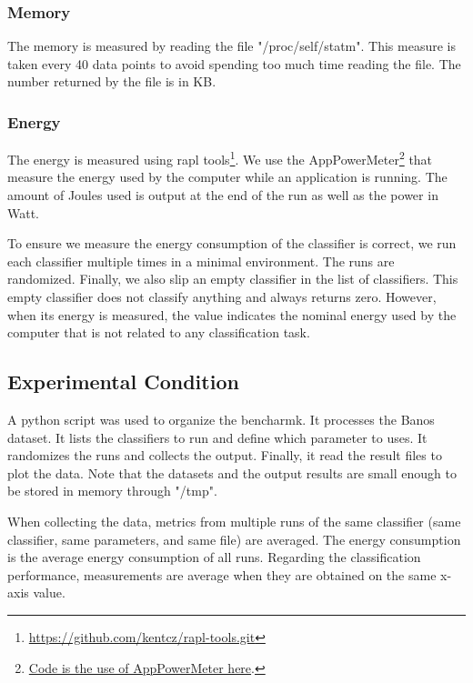\subsubsection{Memory}
The memory is measured by reading the file "/proc/self/statm". This measure is
taken every 40 data points to avoid spending too much time reading the file.
The number returned by the file is in KB.

\subsubsection{Energy}
The energy is measured using rapl
tools\footnote{\url{https://github.com/kentcz/rapl-tools.git}}.
We use the
AppPowerMeter\footnote{\href{https://github.com/azazel7/paper-benchmark/blob/9adb1039c5a65a00a66d554f0e870d14d3fff7cb/makefile.py\#L122}{Code
is the use of AppPowerMeter here}.} that measure
the energy used by the computer while an
application is running. The amount of Joules used
is output at the end of the run as well as the
power in Watt.

To ensure we measure the energy consumption of the
classifier is correct, we run each classifier
multiple times in a minimal environment. The runs
are randomized. Finally, we also slip an empty
classifier in the list of classifiers. This empty
classifier does not classify anything and always
returns zero. However, when its energy is
measured, the value indicates the nominal energy
used by the computer that is not related to any
classification task.

\subsection{Experimental Condition}
A python script was used to organize the
bencharmk.  It processes the Banos dataset. It
lists the classifiers to run and define which
parameter to uses. It randomizes the runs and
collects the output. Finally, it read the result
files to plot the data. Note that the datasets and
the output results are small enough to be stored in
memory through "/tmp".

When collecting the data, metrics from multiple
runs of the same classifier (same classifier, same
parameters, and same file) are averaged. The
energy consumption is the average energy
consumption of all runs. Regarding the
classification performance, measurements are
average when they are obtained on the same x-axis
value.

